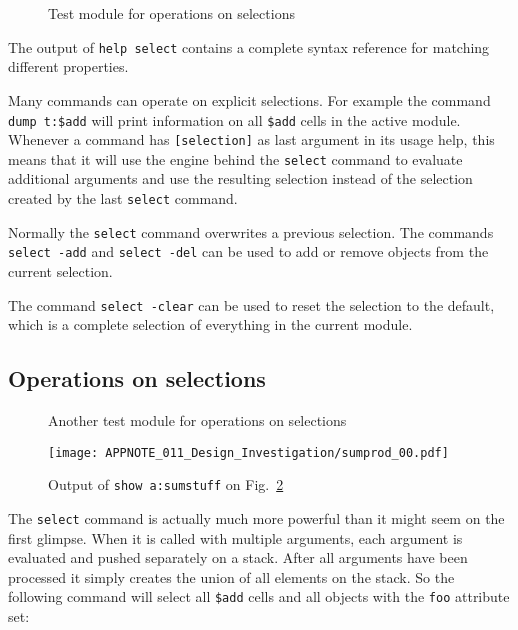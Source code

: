 \documentclass[9pt,technote,a4paper]{IEEEtran}
\begin{document}
\begin{figure}[b]

\caption{Test module for operations on selections}
\label{foobaraddsub}
\end{figure}

The output of {\tt help select} contains a complete syntax reference for
matching different properties.

Many commands can operate on explicit selections. For example the command {\tt
dump t:\$add} will print information on all {\tt \$add} cells in the active
module. Whenever a command has {\tt [selection]} as last argument in its usage
help, this means that it will use the engine behind the {\tt select} command
to evaluate additional arguments and use the resulting selection instead of
the selection created by the last {\tt select} command.

Normally the {\tt select} command overwrites a previous selection. The
commands {\tt select -add} and {\tt select -del} can be used to add
or remove objects from the current selection.

The command {\tt select -clear} can be used to reset the selection to the
default, which is a complete selection of everything in the current module.

\subsection{Operations on selections}

\begin{figure}[t]

\caption{Another test module for operations on selections}
\label{sumprod}
\end{figure}

\begin{figure}[b]
\texttt{[image: APPNOTE\_011\_Design\_Investigation/sumprod\_00.pdf]}
\caption{Output of {\tt show a:sumstuff} on Fig.~\ref{sumprod}}
\label{sumprod_00}
\end{figure}

The {\tt select} command is actually much more powerful than it might seem on
the first glimpse. When it is called with multiple arguments, each argument is
evaluated and pushed separately on a stack. After all arguments have been
processed it simply creates the union of all elements on the stack. So the
following command will select all {\tt \$add} cells and all objects with
the {\tt foo} attribute set:
\end{document}
